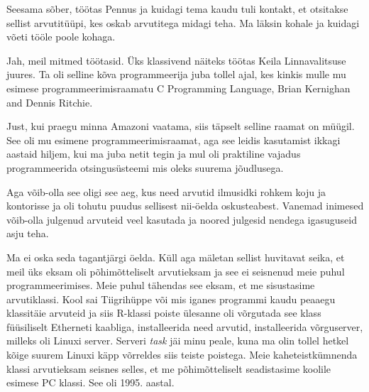 
Seesama sõber, töötas Pennus ja kuidagi tema kaudu tuli kontakt, 
et otsitakse sellist arvutitüüpi, kes oskab arvutitega midagi teha. Ma läksin 
kohale  ja kuidagi võeti tööle poole kohaga.


Jah, meil mitmed töötasid. Üks klassivend näiteks töötas Keila Linnavalitsuse 
juures. Ta oli selline kõva programmeerija juba tollel ajal, kes kinkis mulle 
mu esimese programmeerimisraamatu C Programming Language, Brian Kernighan and Dennis Ritchie.


Just, kui praegu minna Amazoni vaatama, siis täpselt selline raamat on müügil. 
See oli mu esimene programmeerimisraamat, aga see leidis kasutamist ikkagi 
aastaid hiljem, kui ma juba netit tegin ja mul oli praktiline 
vajadus programmeerida otsingusüsteemi mis oleks suurema jõudlusega.


Aga võib-olla see oligi see aeg, kus need arvutid ilmusidki rohkem koju ja 
kontorisse ja oli tohutu puudus sellisest nii-öelda oskusteabest. Vanemad 
inimesed võib-olla julgenud arvuteid veel kasutada ja noored julgesid nendega 
igasuguseid asju teha.


Ma ei oska seda tagantjärgi öelda. Küll aga mäletan sellist huvitavat seika, et 
meil üks  eksam oli põhimõtteliselt arvutieksam ja see ei seisnenud meie puhul 
programmeerimises. Meie puhul tähendas see eksam, et  me sisustasime 
arvutiklassi.  Kool sai Tiigrihüppe või  mis iganes programmi kaudu peaaegu 
klassitäie arvuteid ja siis R-klassi poiste ülesanne 
oli võrgutada see klass 
füüsiliselt Etherneti kaabliga, installeerida need arvutid, installeerida 
võrguserver, milleks oli  Linuxi server. Serveri \emph{task} jäi minu peale, 
kuna ma olin tollel hetkel kõige suurem Linuxi käpp võrreldes 
siis teiste poistega.  Meie kaheteistkümnenda klassi arvutieksam seisnes 
selles, et me põhimõtteliselt seadistasime koolile esimese PC klassi. See oli 
1995. aastal.

